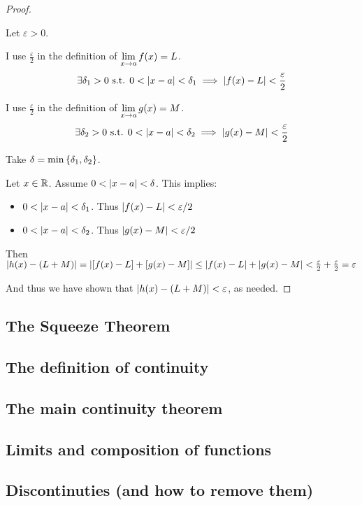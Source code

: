\begin{proof} \(\)

  Let \(\varepsilon > 0\).

  I use \(\frac{\varepsilon}{2}\) in the definition of \(\displaystyle \lim_{x \to a} f(x) = L\). \[\exists \delta_{1} > 0 \text{ s.t. } 0 < \left|x - a\right| < \delta_{1} \implies \left|f(x) - L\right| < \frac{\varepsilon}{2}\]

  I use \(\frac{\varepsilon}{2}\) in the definition of \(\displaystyle \lim_{x \to a} g(x) = M\). \[\exists \delta_{2} > 0 \text{ s.t. } 0 < \left|x - a\right| < \delta_{2} \implies \left|g(x) - M\right| < \frac{\varepsilon}{2}\]

  Take \(\delta = \min\left\{\delta_{1}, \delta_{2}\right\}\).

  Let \(x \in \mathbb{R}\). Assume \(0 < \left|x - a\right| < \delta\). This implies:
  \begin{itemize}
    \item \(0 < \left|x - a\right| < \delta_{1}\). Thus \(\left|f(x) - L\right| < \varepsilon/2\)
    \item \(0 < \left|x - a\right| < \delta_{2}\). Thus \(\left|g(x) - M\right| < \varepsilon/2\)
  \end{itemize}

  Then \(\left|h(x) - \left(L + M\right)\right| = \left|\left[f(x) - L\right] + \left[g(x) - M\right]\right| \leq \left|f(x) - L\right| + \left|g(x) - M\right| < \frac{\varepsilon}{2} + \frac{\varepsilon}{2} = \varepsilon\)

  And thus we have shown that \(\left|h(x) - \left(L + M\right)\right| < \varepsilon\), as needed. \qedhere
\end{proof}

\subsection{The Squeeze Theorem}
\subsection{The definition of continuity}
\subsection{The main continuity theorem}
\subsection{Limits and composition of functions}
\subsection{Discontinuties (and how to remove them)}
